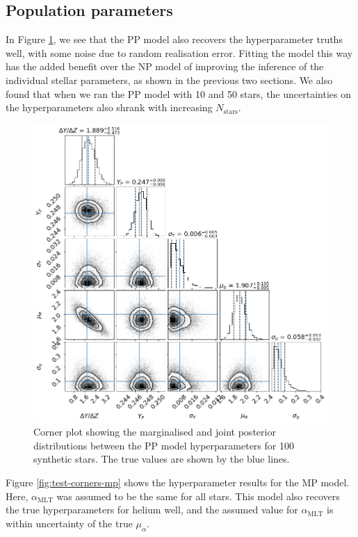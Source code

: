 \documentclass[fleqn,usenatbib]{mnras}
\newcommand{\mlt}{\ensuremath{{\alpha_\mathrm{MLT}}}}
\begin{document}
\subsection{Population parameters}

In Figure \ref{fig:test-corners-pp}, we see that the PP model also recovers the hyperparameter truths well, with some noise due to random realisation error. Fitting the model this way has the added benefit over the NP model of improving the inference of the individual stellar parameters, as shown in the previous two sections. We also found that when we ran the PP model with 10 and 50 stars, the uncertainties on the hyperparameters also shrank with increasing $N_\mathrm{stars}$.

\begin{figure}
    \centering
    \includegraphics[width=\linewidth]{figures/corner_plot_pp_truths.png}
    \caption{Corner plot showing the marginalised and joint posterior distributions between the PP model hyperparameters for 100 synthetic stars. The true values are shown by the blue lines.}  
    \label{fig:test-corners-pp}   
\end{figure}

Figure \ref{fig:test-corners-mp} shows the hyperparameter results for the MP model. Here, $\mlt$ was assumed to be the same for all stars. This model also recovers the true hyperparameters for helium well, and the assumed value for $\mlt$ is within uncertainty of the true $\mu_\alpha$.
\end{document}
